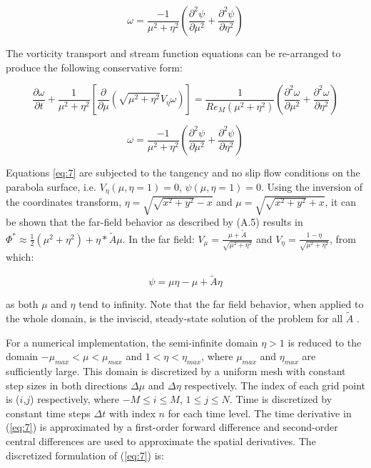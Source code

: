 \documentclass{article}
\newcommand{\pd}{\partial}
\begin{document}
\begin{equation}
\label{eq:6}
\omega = \frac{-1}{\mu^2 + \eta^2} \left(\frac{\pd^2 \psi}{\pd \mu^2} + \frac{\pd^2 \psi}{\pd \eta^2} \right)
\end{equation}

The vorticity transport and stream function equations can be re-arranged to produce the following conservative form:

\[
\frac{\pd \omega}{\pd t} + \frac{1}{\mu^2 + \eta^2} \left[\frac{\pd}{\pd \mu} \left(\sqrt{\mu^2 + \eta^2} V_\eta \omega \right) \right] = \frac{1}{Re_M(\mu^2 + \eta^2)} \left(\frac{\pd^2 \omega}{\pd \mu^2} + \frac{\pd^2 \omega}{\pd \eta^2} \right)
\]

\begin{equation}
\label{eq:7}
\omega = \frac{-1}{\mu^2 + \eta^2} \left(\frac{\pd^2 \psi}{\pd \mu^2} + \frac{\pd^2 \psi}{\pd \eta^2} \right)
\end{equation}

Equations \ref{eq:7} are subjected to the tangency and no slip flow conditions on the parabola surface, i.e. $V_\eta(\mu,\eta=1) = 0$, $\psi(\mu,\eta=1) = 0$. Using the inversion of the coordinates transform, $\eta = \sqrt{ \sqrt{x^2+y^2} - x}$ and $\mu = \sqrt{ \sqrt{x^2+y^2} + x}$, it can be shown that the far-field behavior as described by (A.5) results in
$\Phi^* \approx \frac{1}{2} (\mu^2+\eta^2) + \eta * \tilde{A}\mu$.
In the far field:
$V_\mu = \frac{\mu + \tilde{A}}{\sqrt{\mu^2 + \eta^2}}$ and $V_\eta = \frac{1 - \eta}{\sqrt{\mu^2 + \eta^2}}$, from which:

\begin{equation}
\label{eq:8}
\psi = \mu\eta - \mu + \tilde{A}\eta
\end{equation}

as both $\mu$ and $\eta$ tend to infinity. Note that the far field behavior, when applied to the whole domain, is the inviscid, steady-state solution of the problem for all $\tilde{A}$ .

For a numerical implementation, the semi-infinite domain $\eta > 1$ is reduced to the domain $-\mu_{max} < \mu < \mu_{max}$ and $1 < \eta < \eta_{max}$, where $\mu_{max}$ and $\eta_{max}$ are sufficiently large. This domain is discretized by a uniform mesh with constant step sizes in both directions $\Delta \mu$ and $\Delta \eta$ respectively. The index of each grid point is ($i$,$j$) respectively, where $-M \le i \le M$, $1 \le j \le N$. Time is discretized by constant time steps $\Delta t$ with index $n$ for each time level. The time
derivative in
(\ref{eq:7})
is approximated by a first-order forward difference and second-order central
differences are used to approximate the spatial derivatives. The discretized formulation of (\ref{eq:7}) is:
\end{document}
